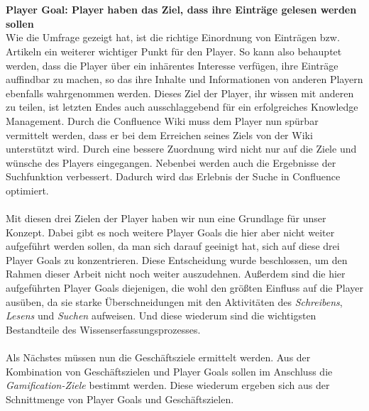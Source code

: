 \documentclass[a4paper,12pt,twoside]{scrartcl}
\begin{document}
\\\\
\textbf{Player Goal: Player haben das Ziel, dass ihre Einträge gelesen werden sollen}\\
Wie die Umfrage gezeigt hat, ist die richtige Einordnung von Einträgen bzw. Artikeln ein weiterer wichtiger Punkt für den Player. So kann also behauptet werden, dass die Player über ein inhärentes Interesse verfügen, ihre Einträge auffindbar zu machen, so das ihre Inhalte und Informationen von anderen Playern ebenfalls wahrgenommen werden. Dieses Ziel der Player, ihr wissen mit anderen zu teilen, ist letzten Endes auch ausschlaggebend für ein erfolgreiches Knowledge Management. Durch die Confluence Wiki muss dem Player nun spürbar vermittelt werden, dass er bei dem Erreichen seines Ziels von der Wiki unterstützt wird. Durch eine bessere Zuordnung wird nicht nur auf die Ziele und wünsche des Players eingegangen. Nebenbei werden auch die Ergebnisse der Suchfunktion verbessert. Dadurch wird das Erlebnis der Suche in Confluence optimiert.
\\\\
Mit diesen drei Zielen der Player haben wir nun eine Grundlage für unser Konzept. Dabei gibt es noch weitere Player Goals die hier aber nicht weiter aufgeführt werden sollen, da man sich darauf geeinigt hat, sich auf diese drei Player Goals zu konzentrieren. Diese Entscheidung wurde beschlossen, um den Rahmen dieser Arbeit nicht noch weiter auszudehnen. Außerdem sind die hier aufgeführten Player Goals diejenigen, die wohl den größten Einfluss auf die Player ausüben, da sie starke Überschneidungen mit den Aktivitäten des \textit{Schreibens}, \textit{Lesens} und \textit{Suchen} aufweisen. Und diese wiederum sind die wichtigsten Bestandteile des Wissenserfassungsprozesses.
\\\\
Als Nächstes müssen nun die Geschäftsziele ermittelt werden. Aus der Kombination von Geschäftszielen und Player Goals sollen im Anschluss die \textit{Gamification-Ziele} bestimmt werden. Diese wiederum ergeben sich aus der Schnittmenge von Player Goals und Geschäftszielen.  
 
\end{document}
